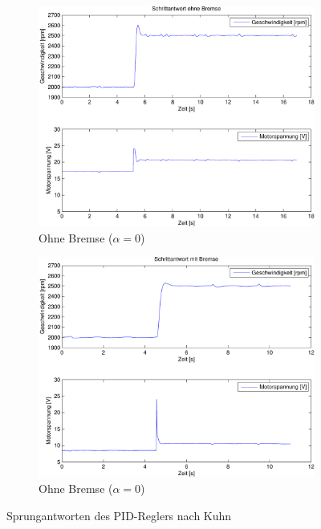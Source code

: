 \begin{figure}[h!]
	\centering
	\begin{subfigure}{0.475\textwidth}
		\includegraphics[width=1\textwidth]{09/step_noload.pdf}
		\caption{Ohne Bremse ($\alpha = 0$)}
	\end{subfigure}
	\hfill{}
	\begin{subfigure}{0.475\textwidth}
		\includegraphics[width=1\textwidth]{09/step_load.pdf}
		\caption{Ohne Bremse ($\alpha = 0$)}
	\end{subfigure}
	\caption{Sprungantworten des PID-Reglers nach Kuhn}
\end{figure}
